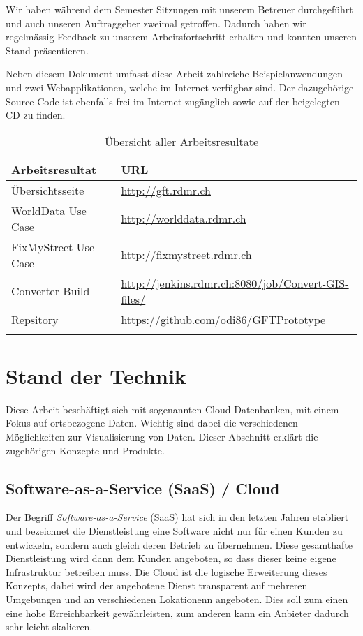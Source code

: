 Wir haben während dem Semester Sitzungen mit unserem Betreuer durchgeführt und auch unseren Auftraggeber zweimal getroffen. Dadurch haben wir regelmässig Feedback zu unserem Arbeitsfortschritt erhalten und konnten unseren Stand präsentieren.

Neben diesem Dokument umfasst diese Arbeit zahlreiche Beispielanwendungen und zwei Webapplikationen, welche im Internet verfügbar sind. Der dazugehörige Source Code ist ebenfalls frei im Internet zugänglich sowie auf der beigelegten CD zu finden.

\begin{longtable}{|l|l|}
\hline 
\textbf{Arbeitsresultat} & \textbf{URL} \\ 
\hline 
Übersichtsseite & \url{http://gft.rdmr.ch} \\ 
\hline 
WorldData Use Case & \url{http://worlddata.rdmr.ch} \\ 
\hline 
FixMyStreet Use Case & \url{http://fixmystreet.rdmr.ch} \\ 
\hline 
Converter-Build & \url{http://jenkins.rdmr.ch:8080/job/Convert-GIS-files/} \\ 
\hline 
Repsitory & \url{https://github.com/odi86/GFTPrototype} \\ 
\hline 
\caption{Übersicht aller Arbeitsresultate}
\label{arbeitsresultate}
\end{longtable} 

\section{Stand der Technik}
Diese Arbeit beschäftigt sich mit sogenannten \gls{Cloud}-Datenbanken, mit einem Fokus auf ortsbezogene Daten. Wichtig sind dabei die verschiedenen Möglichkeiten zur Visualisierung von Daten. Dieser Abschnitt erklärt die zugehörigen Konzepte und Produkte.

\subsection{Software-as-a-Service (SaaS) / Cloud}
Der Begriff \emph{Software-as-a-Service} (\gls{SaaS}) hat sich in den letzten Jahren etabliert und bezeichnet die Dienstleistung eine Software nicht nur für einen Kunden zu entwickeln, sondern auch gleich deren Betrieb zu übernehmen. Diese gesamthafte Dienstleistung wird dann dem Kunden angeboten, so dass dieser keine eigene Infrastruktur betreiben muss. Die \gls{Cloud} ist die logische  Erweiterung dieses Konzepts, dabei wird der angebotene Dienst transparent auf mehreren Umgebungen und an verschiedenen Lokationenn angeboten. Dies soll zum einen eine hohe Erreichbarkeit gewährleisten, zum anderen kann ein Anbieter dadurch sehr leicht skalieren.\cite{cloud}

